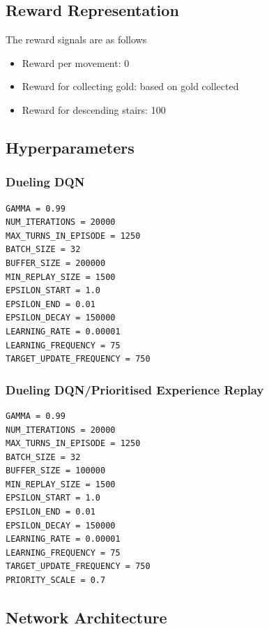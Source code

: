 \documentclass[12pt,a4paper]{article}
\begin{document}
    \subsection{Reward Representation}\label{subsec:reward-representation}
    The reward signals are as follows
    \begin{itemize}
        \item Reward per movement: 0
        \item Reward for collecting gold: based on gold collected
        \item Reward for descending stairs: 100
    \end{itemize}

    \subsection{Hyperparameters}\label{subsec:hyperparameters}
    \subsubsection{Dueling DQN}
    \begin{lstlisting}[label={lst:ddqnhyperparameters}]
GAMMA = 0.99
NUM_ITERATIONS = 20000
MAX_TURNS_IN_EPISODE = 1250
BATCH_SIZE = 32
BUFFER_SIZE = 200000
MIN_REPLAY_SIZE = 1500
EPSILON_START = 1.0
EPSILON_END = 0.01
EPSILON_DECAY = 150000
LEARNING_RATE = 0.00001
LEARNING_FREQUENCY = 75
TARGET_UPDATE_FREQUENCY = 750
    \end{lstlisting}

    \subsubsection{Dueling DQN/Prioritised Experience Replay}
    \begin{lstlisting}[label={lst:ddqnperhyperparameters}]
GAMMA = 0.99
NUM_ITERATIONS = 20000
MAX_TURNS_IN_EPISODE = 1250
BATCH_SIZE = 32
BUFFER_SIZE = 100000
MIN_REPLAY_SIZE = 1500
EPSILON_START = 1.0
EPSILON_END = 0.01
EPSILON_DECAY = 150000
LEARNING_RATE = 0.00001
LEARNING_FREQUENCY = 75
TARGET_UPDATE_FREQUENCY = 750
PRIORITY_SCALE = 0.7
    \end{lstlisting}


    \subsection{Network Architecture}\label{subsec:network-architecture}
\end{document}
